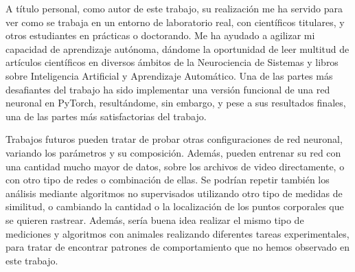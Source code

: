 A título personal, como autor de este trabajo, su realización me ha servido para ver como se trabaja en un entorno de laboratorio real, con científicos titulares, y otros estudiantes en prácticas o doctorando. Me ha ayudado a agilizar mi capacidad de aprendizaje autónoma, dándome la oportunidad de leer multitud de artículos científicos en diversos ámbitos de la Neurociencia de Sistemas y libros sobre Inteligencia Artificial y Aprendizaje Automático. Una de las partes más desafiantes del trabajo ha sido implementar una versión funcional de una red neuronal en PyTorch, resultándome, sin embargo, y pese a sus resultados finales, una de las partes más satisfactorias del trabajo.

Trabajos futuros pueden tratar de probar otras configuraciones de red neuronal, variando los parámetros y su composición. Además, pueden entrenar su red con una cantidad mucho mayor de datos, sobre los archivos de video directamente, o con otro tipo de redes o combinación de ellas. Se podrían repetir también los análisis mediante algoritmos no supervisados utilizando otro tipo de medidas de similitud, o cambiando la cantidad o la localización de los puntos corporales que se quieren rastrear. Además, sería buena idea realizar el mismo tipo de mediciones y algoritmos con animales realizando diferentes tareas experimentales, para tratar de encontrar patrones de comportamiento que no hemos observado en este trabajo.
